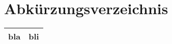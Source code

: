 \section*{Abkürzungsverzeichnis}


\begin{table}[h]
\begin{tabular}{p{5cm} p{10cm} }
\toprule
bla & bli \\
\bottomrule
\end{tabular}
\end{table}